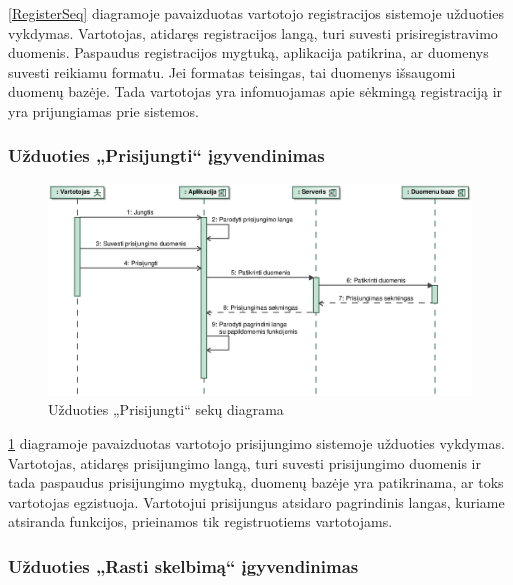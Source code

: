 \documentclass[12pt]{article}
\begin{document}
	\ref{RegisterSeq} diagramoje pavaizduotas vartotojo registracijos sistemoje užduoties vykdymas. Vartotojas, atidaręs registracijos langą, turi suvesti prisiregistravimo duomenis. Paspaudus registracijos mygtuką, aplikacija patikrina, ar duomenys suvesti reikiamu formatu. Jei formatas teisingas, tai duomenys išsaugomi duomenų bazėje. Tada vartotojas yra infomuojamas apie sėkmingą registraciją ir yra prijungiamas prie sistemos.
	\pagebreak
	
	\subsubsection{Užduoties „Prisijungti“ įgyvendinimas}
	
	\begin{figure}[h]
		\begin{center}
			\includegraphics[width=\textwidth]{Prisijungti.eps}
			\caption{Užduoties „Prisijungti“ sekų diagrama\label{LogInSeq}}
		\end{center}
	\end{figure}
	
	\ref{LogInSeq} diagramoje pavaizduotas vartotojo prisijungimo sistemoje užduoties vykdymas. Vartotojas, atidaręs prisijungimo langą, turi suvesti prisijungimo duomenis ir tada paspaudus prisijungimo mygtuką, duomenų bazėje yra patikrinama, ar toks vartotojas egzistuoja. Vartotojui prisijungus atsidaro pagrindinis langas, kuriame atsiranda funkcijos, prieinamos tik registruotiems vartotojams.
	\pagebreak
	
	\subsubsection{Užduoties „Rasti skelbimą“ įgyvendinimas}
	
\end{document}
